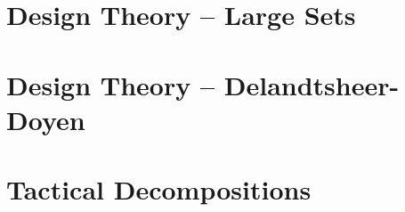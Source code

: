 \bigskip
\clearpage

\section{Design Theory -- Large Sets}
\label{sec:large:sets}









\bigskip
\clearpage
\section{Design Theory -- Delandtsheer-Doyen}
\label{sec:design:DD}









\bigskip
\clearpage


\section{Tactical Decompositions}
\label{sec:tactical:decompositions}








\bigskip
\clearpage

